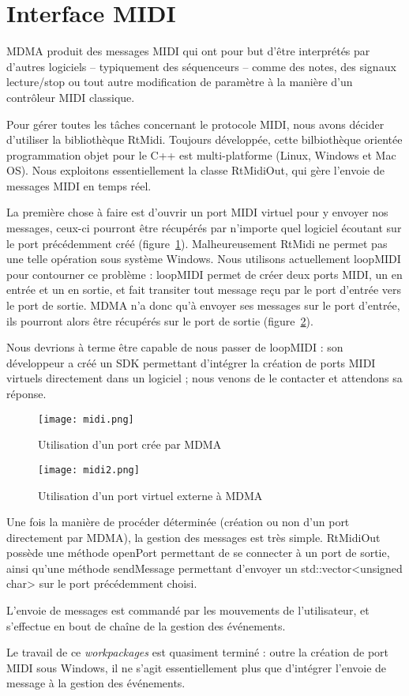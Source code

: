 \section{Interface MIDI}
\par MDMA produit des messages MIDI qui ont pour but d'être interprétés par d'autres logiciels  – typiquement des séquenceurs – comme des notes, des signaux lecture/stop ou tout autre modification de paramètre à la manière d'un contrôleur MIDI classique.
\par Pour gérer toutes les tâches concernant le protocole MIDI, nous avons décider d'utiliser la bibliothèque RtMidi. Toujours développée, cette bilbiothèque orientée programmation objet pour le C++ est multi-platforme (Linux, Windows et Mac OS). Nous exploitons essentiellement la classe RtMidiOut, qui gère l'envoie de messages MIDI en temps réel.
\par La première chose à faire est d'ouvrir un port MIDI virtuel pour y envoyer nos messages, ceux-ci pourront être récupérés par n'importe quel logiciel écoutant sur le port précédemment créé (figure~\ref{MDMA_port}). Malheureusement RtMidi ne permet pas une telle opération sous système Windows. Nous utilisons actuellement loopMIDI pour contourner ce problème : loopMIDI permet de créer deux ports MIDI, un en entrée et un en sortie, et fait transiter tout message reçu par le port d'entrée vers le port de sortie. MDMA n'a donc qu'à envoyer ses messages sur le port d'entrée, ils pourront alors être récupérés sur le port de sortie (figure~\ref{virtual_port}).
\par Nous devrions à terme être capable de nous passer de loopMIDI : son développeur a créé un SDK permettant d'intégrer la création de ports MIDI virtuels directement dans un logiciel ; nous venons de le contacter et attendons sa réponse.
\begin{figure}
	\centering
	\texttt{[image: midi.png]}
	\caption{Utilisation d'un port crée par MDMA}
	\label{MDMA_port}
\end{figure}
\begin{figure}
	\centering
	\texttt{[image: midi2.png]}
	\caption{Utilisation d'un port virtuel externe à MDMA}
	\label{virtual_port}
\end{figure}
\par Une fois la manière de procéder déterminée (création ou non d'un port directement par MDMA), la gestion des messages est très simple. RtMidiOut possède une méthode openPort permettant de se connecter à un port de sortie, ainsi qu'une méthode sendMessage permettant d'envoyer un std::vector<unsigned char> sur le port précédemment choisi.
\par L'envoie de messages est commandé par les mouvements de l'utilisateur, et s'effectue en bout de chaîne de la gestion des événements.
\par Le travail de ce \emph{workpackages} est quasiment terminé : outre la création de port MIDI sous Windows, il ne s'agit essentiellement plus que d'intégrer l'envoie de message à la gestion des événements.



